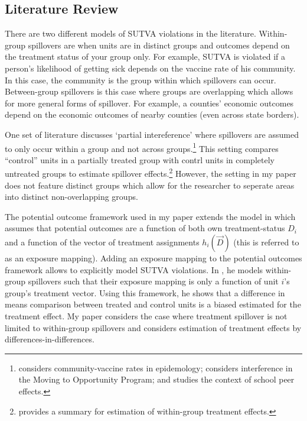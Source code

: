 \documentclass[11pt]{article}
\begin{document}

\subsection{Literature Review}

There are two different models of SUTVA violations in the literature. Within-group spillovers are when units are in distinct groups and outcomes depend on the treatment status of your group only. For example, SUTVA is violated if a person's likelihood of getting sick depends on the vaccine rate of his community. In this case, the community is the group within which spillovers can occur. Between-group spillovers is this case where groups are overlapping which allows for more general forms of spillover. For example, a counties' economic outcomes depend on the economic outcomes of nearby counties (even across state borders). 

One set of literature discusses `partial intereference' where spillovers are assumed to only occur within a group and not across groups.\footnote{\citet{Halloran_Struchiner_1995} considers community-vaccine rates in epidemology; \citet{Sobel_2006} considers interference in the Moving to Opportunity Program; and \citet{Angrist_2014} studies the context of school peer effects.} This setting compares ``control'' units in a partially treated group with contrl units in completely untreated groups to estimate spillover effects.\footnote{\citet{Angelucci_DiMaro_2016} provides a summary for estimation of within-group treatment effects.} However, the setting in my paper does not feature distinct groups which allow for the researcher to seperate areas into distinct non-overlapping groups.

The potential outcome framework used in my paper extends the model in \citet{Vazquez-Bare_2019} which assumes that potential outcomes are a function of both own treatment-status $D_i$ and a function of the vector of treatment assignments $h_i(\vec{D})$ (this is referred to as an exposure mapping). Adding an exposure mapping to the potential outcomes framework allows to explicitly model SUTVA violations. In \citet{Vazquez-Bare_2019}, he models within-group spillovers such that their exposure mapping is only a function of unit $i$'s group's treatment vector. Using this framework, he shows that a difference in means comparison between treated and control units is a biased estimated for the treatment effect. My paper considers the case where treatment spillover is not limited to within-group spillovers and considers estimation of treatment effects by differences-in-differences. 
\end{document}
